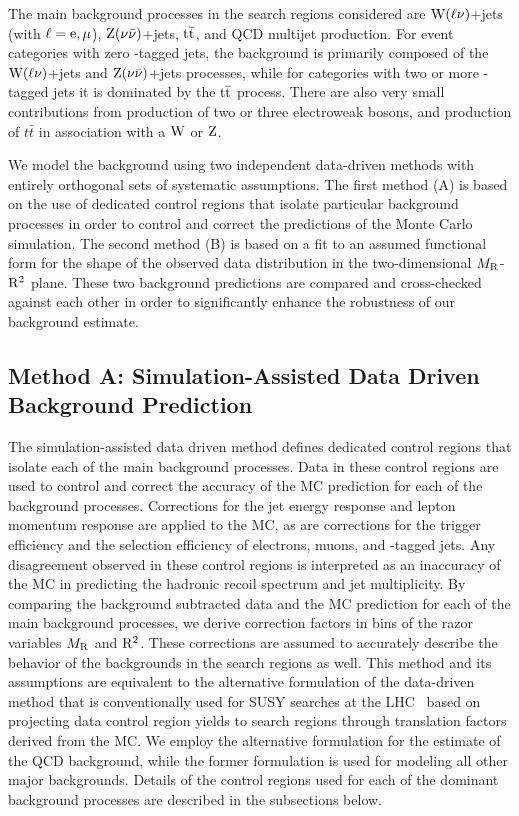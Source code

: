 The main background processes in the search regions considered are
$\mathrm{W}(\ell\nu)$+jets (with $\ell=\mathrm{e},{\mu}$), $\mathrm{Z}(\nu\bar\nu)$+jets, $\mathrm{t}\overline{\mathrm{t}}$, and QCD multijet production. For event categories with
zero \PQb-tagged jets, the background is primarily composed of the $\mathrm{W}(\ell\nu)$+jets and $\mathrm{Z}(\nu\bar\nu)$+jets
processes, while for categories with two or more \PQb-tagged jets it is
dominated by the $\mathrm{t}\overline{\mathrm{t}}$ process. There are also very small contributions from
production of two or three electroweak bosons, and production of $t\bar{t}$ in
association with a $\mathrm{W}$ or $\mathrm{Z}$.

We model the background using two independent data-driven methods with entirely
orthogonal sets of systematic assumptions. The first method (A) is based on the use of 
dedicated control regions that isolate particular background processes in order 
to control and correct the predictions of the Monte Carlo simulation. 
The second method (B) is based on a fit to an assumed functional 
form for the shape of the observed data distribution in the two-dimensional $M_\mathrm{R}$-$\mathrm{R}^2$ plane. 
These two background predictions are compared and cross-checked against each other in order 
to significantly enhance the robustness of our background estimate. 



\subsection{Method A: Simulation-Assisted Data Driven Background Prediction}
\label{sec:MADD}

The simulation-assisted data driven method defines dedicated control regions that isolate
each of the main background processes. Data in these control regions are used 
to control and correct the accuracy of the MC prediction for each of the
background processes. Corrections for the jet energy response and lepton momentum response
are applied to the MC, as are corrections for the trigger 
efficiency and the selection efficiency of electrons, muons, and \PQb-tagged jets. Any
disagreement observed in these control regions is interpreted as an inaccuracy of the 
MC in predicting the hadronic recoil spectrum and jet multiplicity.
By comparing the background subtracted data and the MC prediction
for each of the main background processes, we derive correction factors in bins of
the razor variables $M_\mathrm{R}$ and $\mathrm{R}^2$. These corrections are assumed to accurately
describe the behavior of the backgrounds in the search regions as well. This method
and its assumptions are equivalent to the alternative formulation of the data-driven method
that is conventionally used for SUSY searches at the 
LHC~\cite{SUS12024,MT2at8TeV,Aad:2013wta}
based on projecting data control region yields to search regions through translation 
factors derived from the MC. We employ the alternative formulation
for the estimate of the QCD background, while the former formulation is used for
modeling all other major backgrounds. Details of the control regions used for each of 
the dominant background processes are described in the subsections below.


